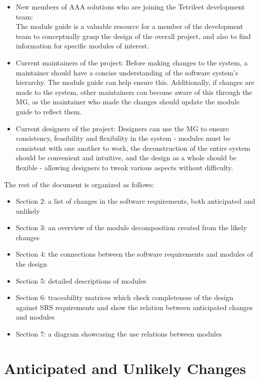 \documentclass[12pt, titlepage]{article}
\begin{document}
\begin{itemize}
\item New members of AAA solutions who are joining the Tetrileet development team:
\\The module guide is a valuable resource for a member of the development team to 
  conceptually grasp the design of the overall project, and also to find information for specific modules of interest.
\item Current maintainers of the project: Before making changes to the system, a maintainer should have a concise understanding of the software system's hierarchy. The module guide can help ensure this. Additionally, if changes are made to the system, other maintainers can become aware of this through the MG, as the maintainer who made the changes should update the module guide to reflect them.
\item Current designers of the project: Designers can use the MG to ensure consistency, feasibility and flexibility in the system - modules must be consistent with one another to work, the deconstruction of the entire system should be convenient and intuitive, and the design as a whole should be flexible - allowing designers to tweak various aspects without difficulty.  
\end{itemize}

The rest of the document is organized as follows:


\begin{itemize}
\item Section 2: a list of changes in the software requirements, both anticipated and unlikely
\item Section 3: an overview of the module decomposition created from the likely changes
\item Section 4: the connections between the software requirements and modules of the design
\item Section 5: detailed descriptions of modules
\item Section 6: traceability matrices which check completeness of the design against SRS requirements and show the relation between anticipated changes and modules
\item Section 7: a diagram showcasing the use relations between modules
\end{itemize}




\section{Anticipated and Unlikely Changes} \label{SecChange}
\end{document}
